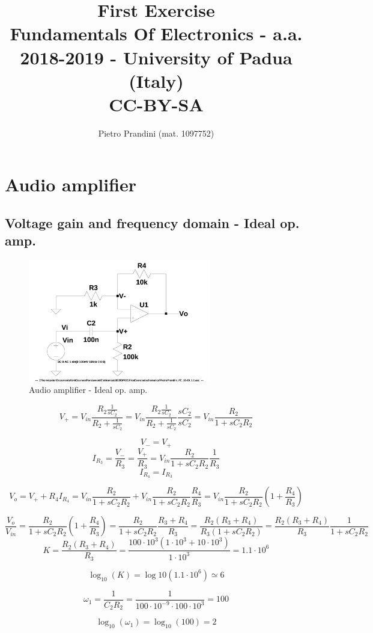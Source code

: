 \documentclass[10pt,a4paper]{article}
\title{First Exercise\\{\small{Fundamentals Of Electronics - a.a. 2018-2019 -
University of Padua (Italy)}}\\{\tiny{{CC-BY-SA}}}}
\author{Pietro Prandini (mat. 1097752)}
\begin{document}
\maketitle
\section{Audio amplifier}
\subsection{Voltage gain and frequency domain - Ideal op. amp.}
\begin{figure}[h]
  \centering
  \includegraphics[width=8cm]{schematics/1d1.jpg}
  \caption{Audio amplifier - Ideal op. amp.}
  \label{1d1}
\end{figure}

$$V_+ = V_{in}\frac{R_2\frac{1}{sC_2}}{R_2+\frac{1}{sC_2}} =
V_{in}\frac{R_2\frac{1}{sC_2}}{R_2+\frac{1}{sC_2}}\frac{sC_2}{sC_2} =
V_{in}\frac{R_2}{1+sC_2R_2}$$

$$V_- = V_+$$
$$I_{R_3} = \frac{V_-}{R_3} = \frac{V_+}{R_3} = V_{in}\frac{R_2}{1+sC_2R_2}\frac{1}{R_3}$$
$$I_{R_4} = I_{R_3}$$

$$V_o = V_+ + R_4I_{R_4} =
V_{in}\frac{R_2}{1+sC_2R_2} + V_{in}\frac{R_2}{1+sC_2R_2}\frac{R_4}{R_3} =
V_{in}\frac{R_2}{1+sC_2R_2}\left(1+\frac{R_4}{R_3}\right)$$

$$\frac{V_o}{V_{in}} = \frac{R_2}{1+sC_2R_2}\left(1+\frac{R_4}{R_3}\right) =
\frac{R_2}{1+sC_2R_2}\frac{R_3+R_4}{R_3} = \frac{R_2(R_3+R_4)}{R_3(1+sC_2R_2)} =
\frac{R_2(R_3+R_4)}{R_3}\frac{1}{1+sC_2R_2}$$
$$ K = \frac{R_2(R_3+R_4)}{R_3} = \frac{100 \cdot 10^3(1 \cdot 10^3 + 10 \cdot 10^3)}{1 \cdot 10^3} = 1.1 \cdot 10^6$$

$$ \log_{10}(K) = \log{10}(1.1 \cdot 10^6) \simeq 6$$

$$ \omega_1 = \frac{1}{C_2R_2} =
\frac{1}{100 \cdot 10^{-9} \cdot 100 \cdot 10^3} = 100$$

$$\log_{10} (\omega_1) = \log_{10} (100) = 2$$
\end{document}
